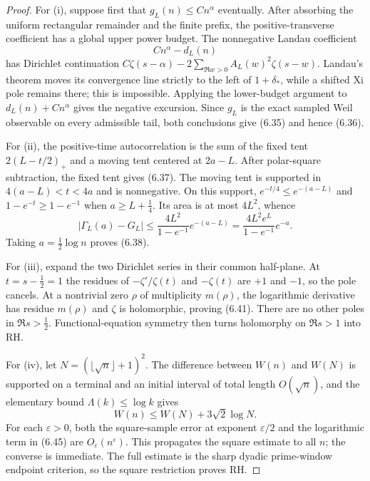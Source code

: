 \documentclass[11pt]{article}
\begin{document}
\begin{proof}
For \textup{(i)}, suppose first that $g_L(n)\le Cn^\alpha$ eventually.  After absorbing the
uniform rectangular remainder and the finite prefix, the positive-transverse coefficient has a
global upper power budget.  The nonnegative Landau coefficient
\[
 Cn^\alpha-d_L(n)
\]
has Dirichlet continuation
$C\zeta(s-\alpha)-2\sum_{\Re w>0}A_L(w)^2\zeta(s-w)$.
Landau's theorem moves its convergence line strictly to the left of $1+\delta_*$, while a shifted
Xi pole remains there; this is impossible.  Applying the lower-budget argument to
$d_L(n)+Cn^\alpha$ gives the negative excursion.  Since $g_L$ is the exact sampled Weil
observable on every admissible tail, both conclusions give \textup{(6.35)} and hence
\textup{(6.36)}.

For \textup{(ii)}, the positive-time autocorrelation is the sum of the fixed tent
$2(L-t/2)_+$ and a moving tent centered at $2a-L$.  After polar-square subtraction, the fixed
tent gives \textup{(6.37)}.  The moving tent is supported in
$4(a-L)<t<4a$ and is nonnegative.  On this support,
$e^{-t/4}\le e^{-(a-L)}$ and $1-e^{-t}\ge1-e^{-1}$ when
$a\ge L+\frac14$.  Its area is at most $4L^2$, whence
\[
 |\Gamma_L(a)-G_L|
 \le\frac{4L^2}{1-e^{-1}}e^{-(a-L)}
 =\frac{4L^2e^L}{1-e^{-1}}e^{-a}.
\]
Taking $a=\frac12\log n$ proves \textup{(6.38)}.

For \textup{(iii)}, expand the two Dirichlet series in their common half-plane.  At
$t=s-\frac12=1$ the residues of $-\zeta'/\zeta(t)$ and $-\zeta(t)$ are $+1$ and $-1$, so the
pole cancels.  At a nontrivial zero $\rho$ of multiplicity $m(\rho)$, the logarithmic derivative
has residue $m(\rho)$ and $\zeta$ is holomorphic, proving \textup{(6.41)}.  There are no other
poles in $\Re s>\frac12$.  Functional-equation symmetry then turns holomorphy on $\Re s>1$
into RH.

For \textup{(iv)}, let $N=(\lfloor\sqrt n\rfloor+1)^2$.  The difference between $W(n)$ and
$W(N)$ is supported on a terminal and an initial interval of total length $O(\sqrt n)$, and the
elementary bound $\Lambda(k)\le\log k$ gives
\[
 W(n)\le W(N)+3\sqrt2\log N.
 \tag{6.45}
\]
For each $\varepsilon>0$, both the square-sample error at exponent $\varepsilon/2$ and the
logarithmic term in \textup{(6.45)} are $O_\varepsilon(n^\varepsilon)$.  This propagates the
square estimate to all $n$; the converse is immediate.  The full estimate is the sharp dyadic
prime-window endpoint criterion, so the square restriction proves RH.
\end{proof}
\end{document}

